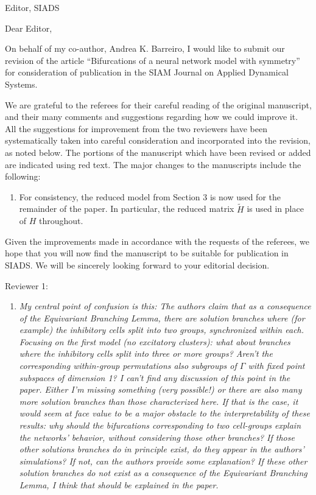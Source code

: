 \documentclass[11pt]{letter}
\begin{document}
\address{Ross Parker \\
Department of Mathematics \\
Southern Methodist University \\
Dallas, TX 75275 \\
\texttt{rhparker@smu.edu}}%
\signature{Ross Parker}
\begin{letter}{Editor, SIADS}

\opening{Dear Editor,}

On behalf of my co-author, Andrea K. Barreiro, I would like to submit our revision of the article ``Bifurcations of a neural network model with symmetry'' for consideration of publication in the SIAM Journal on Applied Dynamical Systems. 

We are grateful to the referees for their careful reading of the original manuscript, and their many comments and suggestions regarding how we could improve it. All the suggestions for improvement from the two reviewers have been systematically taken into careful consideration and incorporated into the revision, as noted below. The portions of the manuscript which have been revised or added are indicated using red text. The major changes to the manuscripts include the following:
\begin{enumerate}
    \item For consistency, the reduced model from Section 3 is now used for the remainder of the paper. In particular, the reduced matrix $\tilde{H}$ is used in place of $H$ throughout.
\end{enumerate}

Given the improvements made in accordance with the requests of the referees, we hope that you will now find the manuscript to be suitable for publication in SIADS. We will be sincerely looking forward to your editorial decision.

Reviewer 1: 
\begin{enumerate}
\item \emph{My central point of confusion is this: The authors claim that as a consequence of the Equivariant Branching Lemma, there are solution branches where (for example) the inhibitory cells split into two groups, synchronized within each. Focusing on the first model (no excitatory clusters): what about branches where the inhibitory cells split into three or more groups? Aren't the corresponding within-group permutations also subgroups of $\Gamma$ with fixed point subspaces of dimension 1? I can't find any discussion of this point in the paper. Either I'm missing something (very possible!) or there are also many more solution branches than those characterized here. If that is the case, it would seem at face value to be a major obstacle to the interpretability of these results: why should the bifurcations corresponding to two cell-groups explain the networks' behavior, without considering those other branches? If those other solutions branches do in principle exist, do they appear in the authors' simulations? If not, can the authors provide some explanation? If these other solution branches do not exist as a consequence of the Equivariant Branching Lemma, I think that should be explained in the paper.}


\end{enumerate}
\end{letter}
\end{document}
